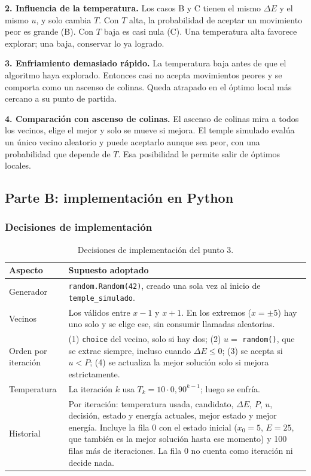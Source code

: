 \documentclass[12pt,a4paper]{article}
\begin{document}


\noindent\textbf{2. Influencia de la temperatura.} Los casos B y C tienen el
mismo $\Delta E$ y el mismo $u$, y solo cambia $T$. Con $T$ alta, la
probabilidad de aceptar un movimiento peor es grande (B). Con $T$ baja es
casi nula (C). Una temperatura alta favorece explorar; una baja, conservar
lo ya logrado.

\noindent\textbf{3. Enfriamiento demasiado rápido.} La temperatura baja antes
de que el algoritmo haya explorado. Entonces casi no acepta movimientos
peores y se comporta como un ascenso de colinas. Queda atrapado en el óptimo
local más cercano a su punto de partida.

\noindent\textbf{4. Comparación con ascenso de colinas.} El ascenso de
colinas mira a todos los vecinos, elige el mejor y solo se mueve si mejora.
El temple simulado evalúa un único vecino aleatorio y puede aceptarlo aunque
sea peor, con una probabilidad que depende de $T$. Esa posibilidad le permite
salir de óptimos locales.

\subsection{Parte B: implementación en Python}

\subsubsection{Decisiones de implementación}

\begin{table}[H]
\centering\small
\renewcommand{\arraystretch}{1.15}
\begin{tabular}{|l|>{\raggedright\arraybackslash}p{9.6cm}|}
\hline
\textbf{Aspecto} & \textbf{Supuesto adoptado} \\ \hline
Generador & \texttt{random.Random(42)}, creado una sola vez al inicio de
\texttt{temple\_simulado}. \\ \hline
Vecinos & Los válidos entre $x-1$ y $x+1$. En los extremos ($x=\pm5$) hay uno
solo y se elige ese, sin consumir llamadas aleatorias. \\ \hline
Orden por iteración & (1) \texttt{choice} del vecino, solo si hay dos;
(2) $u=$ \texttt{random()}, que se extrae siempre, incluso cuando
$\Delta E\le0$; (3) se acepta si $u<P$; (4) se actualiza la mejor solución
solo si mejora estrictamente. \\ \hline
Temperatura & La iteración $k$ usa $T_k=10\cdot0{,}90^{k-1}$; luego se enfría. \\
\hline
Historial & Por iteración: temperatura usada, candidato, $\Delta E$, $P$,
$u$, decisión, estado y energía actuales, mejor estado y mejor energía. Incluye
la fila 0 con el estado inicial ($x_0=5$, $E=25$, que también es la mejor
solución hasta ese momento) y 100 filas más de iteraciones. La fila 0 no cuenta
como iteración ni decide nada. \\ \hline
\end{tabular}
\caption{Decisiones de implementación del punto 3.}
\label{tab:p3-decisiones}
\end{table}
\end{document}
